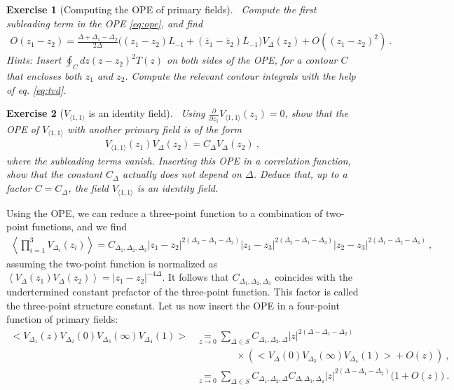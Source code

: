 \documentclass[12pt, a4paper]{article}
\theoremstyle{break}
\newtheorem{exo}{Exercise}[section]
\begin{document}
\begin{exo}[Computing the OPE of primary fields]
~\label{exo:ope}
 Compute the first subleading term in the OPE \eqref{eq:ope}, and find
 \begin{align}
  O(z_1-z_2) = \frac{\Delta+\Delta_1-\Delta_2}{2\Delta} \Big( (z_1-z_2)L_{-1}+(\bar z_1-\bar z_2)\bar L_{-1}\Big) V_{\Delta}(z_2) + O((z_1-z_2)^2)\ .
 \end{align}
Hints: Insert $\oint_C dz(z-z_2)^2 T(z)$ on both sides of the OPE, for a contour $C$ that encloses both $z_1$ and $z_2$. Compute the relevant contour integrals with the help of eq. \eqref{eq:tvd}.
\end{exo}
\begin{tcolorbox}
\begin{exo}[$V_{\langle 1,1\rangle}$ is an identity field]
~\label{exo:id}
Using $\frac{\partial}{\partial z_1} V_{\langle 1,1\rangle}(z_1)=0$, show that the OPE of $V_{\langle 1,1\rangle}$ with another primary field is of the form 
\begin{align}
 V_{\langle 1,1\rangle}(z_1)V_\Delta(z_2) = C_\Delta V_\Delta(z_2)\ ,
\end{align}
where the subleading terms vanish. Inserting this OPE in a correlation function, show that the constant $C_\Delta$ actually does not depend on $\Delta$. Deduce that, up to a factor $C=C_\Delta$, the field $V_{\langle 1,1\rangle}$ is an identity field.
\end{exo}
\end{tcolorbox}
Using the OPE, we can reduce a three-point function to a combination of two-point functions, and we find 
\begin{align}
 \left<\prod_{i=1}^3 V_{\Delta_i}(z_i) \right> = C_{\Delta_1,\Delta_2,\Delta_3} |z_1-z_2|^{2(\Delta_3-\Delta_1-\Delta_2)} |z_1-z_3|^{2(\Delta_2-\Delta_1-\Delta_3)} |z_2-z_3|^{2(\Delta_1-\Delta_2-\Delta_3)}\ ,
\end{align}
assuming the two-point function is normalized as $\left< V_{\Delta}(z_1)V_{\Delta}(z_2) \right> = |z_1-z_2|^{-4\Delta}$.
It follows that $C_{\Delta_1,\Delta_2,\Delta_3}$ coincides with the undertermined constant prefactor of the three-point function. This factor is called the three-point structure constant.
Let us now insert the OPE in a four-point function of primary fields:
\begin{align}
 \Big<V_{\Delta_1}(z)V_{\Delta_2}(0)V_{\Delta_3}(\infty)V_{\Delta_4}(1)\Big>
 &\underset{z\to 0}{=} \sum_{\Delta\in S} C_{\Delta_1,\Delta_2,\Delta} |z|^{2(\Delta-\Delta_1-\Delta_2)}
 \nonumber
\\ & \qquad \qquad \times 
 \left(\Big< V_\Delta(0)V_{\Delta_3}(\infty)V_{\Delta_4}(1)\Big> + O(z)\right) \ ,
 \\
 &\underset{z\to 0}{=} \sum_{\Delta\in S} C_{\Delta_1,\Delta_2,\Delta} C_{\Delta,\Delta_3,\Delta_4}
|z|^{2(\Delta-\Delta_1-\Delta_2)} \Big(1 +O(z) \Big)\ .
\end{align}
\end{document}
